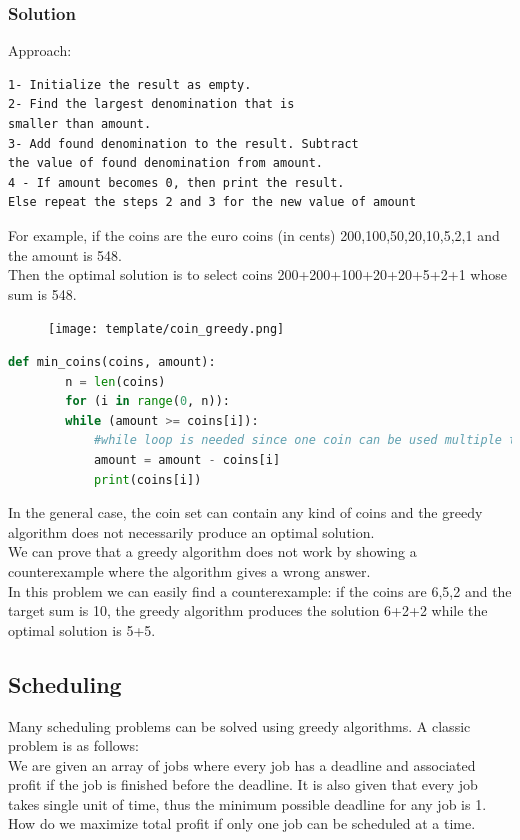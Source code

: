 \documentclass[12pt]{article}
\begin{document}
	\subsubsection{Solution}
    Approach:
	\begin{lstlisting}[numbers=none, frame=none]
1- Initialize the result as empty.
2- Find the largest denomination that is 
smaller than amount.
3- Add found denomination to the result. Subtract 
the value of found denomination from amount.
4 - If amount becomes 0, then print the result.  
Else repeat the steps 2 and 3 for the new value of amount
	\end{lstlisting}
	
	For example, if the coins are the euro coins (in cents) {200,100,50,20,10,5,2,1} and the amount is 548.\\
	Then the optimal solution is to select coins 200+200+100+20+20+5+2+1 whose sum is 548.
	\begin{figure}[h!]
        	\centering
        	\texttt{[image: template/coin\_greedy.png]}
        	\label{fig:coin_greedy}
        \end{figure}
	
	\begin{lstlisting}[language=Python]
	def min_coins(coins, amount):
	    n = len(coins)
        for (i in range(0, n)):
        while (amount >= coins[i]):
            #while loop is needed since one coin can be used multiple times
            amount = amount - coins[i]
            print(coins[i])

    \end{lstlisting}
    In the general case, the coin set can contain any kind of coins and the greedy algorithm does not necessarily produce an optimal solution.\\
    We can prove that a greedy algorithm does not work by showing a counterexample where the algorithm gives a wrong answer.\\
    In this problem we can easily find a counterexample: if the coins are {6,5,2} and the target sum is 10, the greedy algorithm produces the solution 6+2+2 while the optimal solution is 5+5.
    \subsection{Scheduling}
    Many scheduling problems can be solved using greedy algorithms. A classic problem is as follows:\\
    We are given an array of jobs where every job has a deadline and associated profit if the job is finished before the deadline. It is also given that every job takes single unit of time, thus the minimum possible deadline for any job is 1. How do we maximize total profit if only one job can be scheduled at a time.
\end{document}
